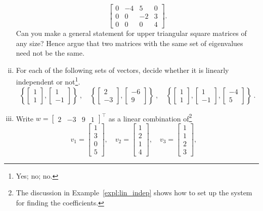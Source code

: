 \begin{exercise}
\begin{enumerate}[(i)]
\[\begin{bmatrix}
	0 & -4 &  5 &  0 \\
	0 &  0 & -2 &  3 \\
	0 &  0 &  0 &  4  
	\end{bmatrix}.\]
	Can you make a general statement for upper triangular square matrices of any size? Hence argue that two matrices with the same set of eigenvalues need not be the same.
	\item For each of the following sets of vectors, decide whether it is linearly independent or not\footnote{Yes; no; no.}.
	\[ \left\{ \begin{bmatrix} 1 \\ 1 \end{bmatrix},
	\begin{bmatrix} 1 \\ -1 \end{bmatrix} \right\} \:, \quad
	\left\{ \begin{bmatrix} 2 \\ -3 \end{bmatrix},
	\begin{bmatrix} -6 \\ 9 \end{bmatrix} \right\} \:, \quad
	\left\{ \begin{bmatrix} 1 \\ 1 \end{bmatrix},
	\begin{bmatrix} 1 \\ -1 \end{bmatrix},
	\begin{bmatrix} -4 \\ 5 \end{bmatrix} \right\} \:. \]
 	\item Write $w=\begin{bmatrix} 2 & -3 & 9 & 1 \end{bmatrix}^\top$ as a linear combination
 	of\footnote{The discussion in Example~\ref{expl:lin_indep} shows how to set up the system for finding the coefficients.} 
	\[ v_1 = \begin{bmatrix} 1 \\ 3 \\ 0 \\ 5 \end{bmatrix}, \quad
	v_2 = \begin{bmatrix} 1 \\ 2 \\ 1 \\ 4 \end{bmatrix}, \quad
	v_3 = \begin{bmatrix} 1 \\ 1 \\ 2 \\ 3 \end{bmatrix} , \quad
\]
\end{enumerate}
\end{exercise}
